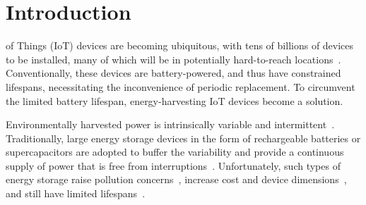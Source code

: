 
\section{Introduction} \label{section:intro}


 of Things (IoT) devices are becoming ubiquitous, with tens of billions of devices to be installed, many of which will be in potentially hard-to-reach locations~\cite{7954016, sundmaeker2010vision, dave2011next}.
Conventionally, these devices are battery-powered, and thus have constrained lifespans, necessitating the inconvenience of periodic replacement. To circumvent the limited battery lifespan, energy-harvesting IoT devices become a solution. 

Environmentally harvested power is intrinsically variable and intermittent~\cite{4494336}. Traditionally, large energy storage devices in the form of rechargeable batteries or supercapacitors are adopted to buffer the variability and provide a continuous supply of power that is free from interruptions~\cite{5522465, Kansal:2007:PME:1274858.1274870, Buchli:2014:DPM:2668332.2668333, Wagemann:2017:OER:3136518.3078631, Jiang:2005:PEP:1147685.1147765, Simjee:2006:ELS:1165573.1165619}. Unfortunately, such types of energy storage raise pollution concerns~\cite{LIU2014210}, increase cost and device dimensions~\cite{4494753}, and still have limited lifespans~\cite{AKHTAR2015769, 4494753}. 

